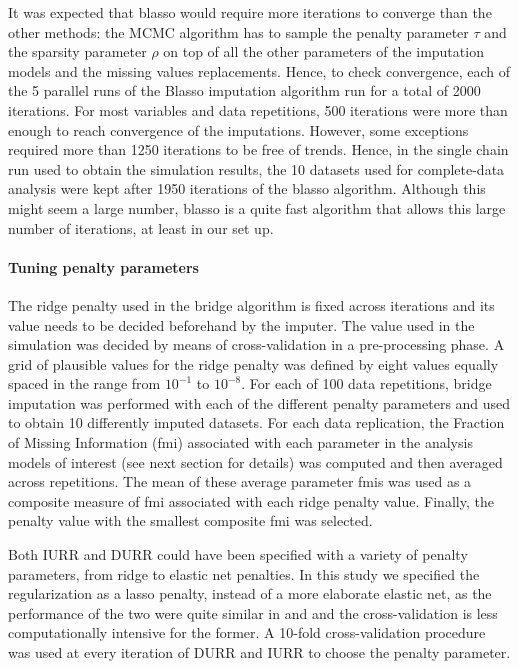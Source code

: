 	It was expected that blasso would require more iterations to converge than the other methods: the MCMC algorithm
	has to sample the penalty parameter $\tau$ and the sparsity parameter $\rho$ on top of all the other parameters 
	of the imputation models and the missing values replacements.
	Hence, to check convergence, each of the 5 parallel runs of the Blasso imputation algorithm run for a total 
	of 2000 iterations.
	For most variables and data repetitions, 500 iterations were more than enough to reach convergence of the 
	imputations.
	However, some exceptions required more than 1250 iterations to be free of trends.
	Hence, in the single chain run used to obtain the simulation results, the 10 datasets used for complete-data 
	analysis were kept after 1950 iterations of the blasso algorithm.
	Although this might seem a large number, blasso is a quite fast algorithm that allows this large number of iterations,
	at least in our set up.

	\paragraph{Tuning penalty parameters}

	The ridge penalty used in the bridge algorithm is fixed across iterations and its value needs to be
	decided beforehand by the imputer.
	The value used in the simulation was decided by means of cross-validation in a pre-processing phase.
	A grid of plausible values for the ridge penalty was defined by eight values equally spaced in the range from 
	$10^{-1}$ to $10^{-8}$. 
	For each of 100 data repetitions, bridge imputation was performed with each of the different penalty parameters
	and used to obtain 10 differently imputed datasets.
	For each data replication, the Fraction of Missing Information (fmi) \citep{savaleiRhemtulla:2012} associated with each 
	parameter in the analysis models of interest (see next section for details) was computed and then averaged across 
	repetitions.
	The mean of these average parameter fmis was used as a composite measure of fmi associated with each ridge penalty
	value.
	Finally, the penalty value with the smallest composite fmi was selected.
		
	Both IURR and DURR could have been specified with a variety of penalty parameters, from ridge to 
	elastic net penalties.
	In this study we specified the regularization as a lasso penalty, instead of a more elaborate elastic net, as
	the performance of the two were quite similar in \cite{zhaoLong:2016} and \cite{dengEtAl:2016} and the 
	cross-validation is less computationally intensive for the former.
	A 10-fold cross-validation procedure was used at every iteration of DURR and IURR to choose the penalty parameter.

